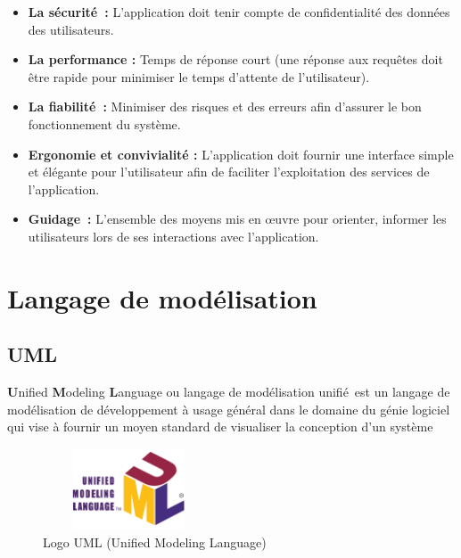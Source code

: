 \documentclass[12pt]{report}
\begin{document}
\begin{itemize}
    \item \textbf{La sécurité :} L’application doit tenir compte de confidentialité des données des utilisateurs.
    \item \textbf{La performance :} Temps de réponse court (une réponse aux requêtes doit être rapide pour minimiser le temps d’attente de l’utilisateur).
    \item \textbf{La fiabilité :} Minimiser des risques et des erreurs afin d’assurer le bon fonctionnement du système.
    \item \textbf{Ergonomie et convivialité :} L’application doit fournir une interface simple et élégante pour l’utilisateur afin de faciliter l’exploitation des services de l’application.
    \item \textbf{Guidage :} L’ensemble des moyens mis en œuvre pour orienter, informer les utilisateurs lors de ses interactions avec l’application.
\end{itemize}

\newpage

\section{Langage de modélisation}
\subsection{UML}
\vspace{0.1in}
\hspace*{0.16in}
\textbf{U}nified \textbf{M}odeling \textbf{L}anguage ou langage de modélisation unifié est un langage de modélisation de développement à usage général dans le domaine du génie logiciel qui vise à fournir un moyen standard de visualiser la conception d’un système

\vspace{0.1in}

\begin{figure}[h]
\centering
    \includegraphics[width = 2in, height = 0.95in]{../images/UMLlogo.png}
  \caption{Logo UML (Unified Modeling Language)}
\end{figure}

\vspace*{-0.2in}
\end{document}
